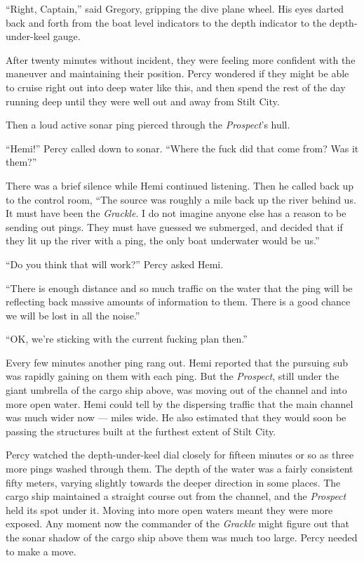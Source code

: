 \documentclass[
]{scrbook}
\begin{document}
``Right, Captain,'' said Gregory, gripping the dive plane wheel. His
eyes darted back and forth from the boat level indicators to the depth
indicator to the depth-under-keel gauge.

After twenty minutes without incident, they were feeling more confident
with the maneuver and maintaining their position. Percy wondered if they
might be able to cruise right out into deep water like this, and then
spend the rest of the day running deep until they were well out and away
from Stilt City.

Then a loud active sonar ping pierced through the \emph{Prospect}'s
hull.

``Hemi!'' Percy called down to sonar. ``Where the fuck did that come
from? Was it them?''

There was a brief silence while Hemi continued listening. Then he called
back up to the control room, ``The source was roughly a mile back up the
river behind us. It must have been the \emph{Grackle}. I do not imagine
anyone else has a reason to be sending out pings. They must have guessed
we submerged, and decided that if they lit up the river with a ping, the
only boat underwater would be us.''

``Do you think that will work?'' Percy asked Hemi.

``There is enough distance and so much traffic on the water that the
ping will be reflecting back massive amounts of information to them.
There is a good chance we will be lost in all the noise.''

``OK, we're sticking with the current fucking plan then.''

Every few minutes another ping rang out. Hemi reported that the pursuing
sub was rapidly gaining on them with each ping. But the \emph{Prospect},
still under the giant umbrella of the cargo ship above, was moving out
of the channel and into more open water. Hemi could tell by the
dispersing traffic that the main channel was much wider now --- miles
wide. He also estimated that they would soon be passing the structures
built at the furthest extent of Stilt City.

Percy watched the depth-under-keel dial closely for fifteen minutes or
so as three more pings washed through them. The depth of the water was a
fairly consistent fifty meters, varying slightly towards the deeper
direction in some places. The cargo ship maintained a straight course
out from the channel, and the \emph{Prospect} held its spot under it.
Moving into more open waters meant they were more exposed. Any moment
now the commander of the \emph{Grackle} might figure out that the sonar
shadow of the cargo ship above them was much too large. Percy needed to
make a move.
\end{document}
